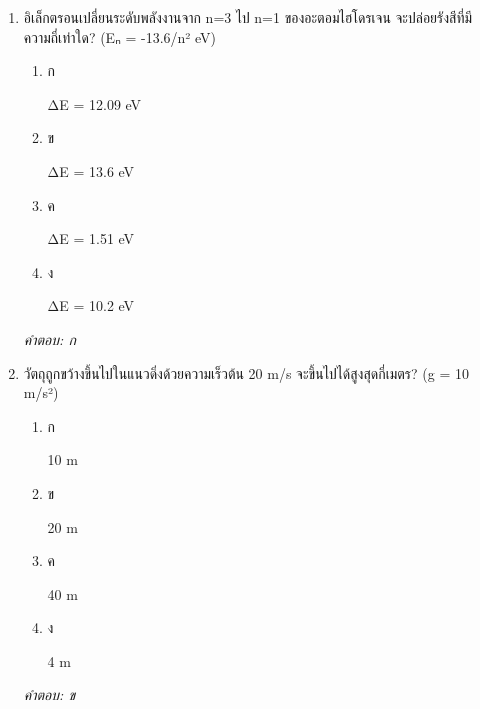 \documentclass[12pt]{article}
\begin{document}
\begin{enumerate}[label=\arabic*., itemsep=0.5\baselineskip, topsep=0.5\baselineskip, leftmargin=*]
\item อิเล็กตรอนเปลี่ยนระดับพลังงานจาก n=3 ไป n=1 ของอะตอมไฮโดรเจน จะปล่อยรังสีที่มีความถี่เท่าใด? (Eₙ = -13.6/n² eV)
\begin{enumerate}[label=\alph*)., itemsep=0.3\baselineskip, topsep=0.3\baselineskip]
\item ก\ 
\begin{minipage}[t]{0.9\linewidth}
\raggedright ΔE = 12.09 eV
\end{minipage}
\item ข\ 
\begin{minipage}[t]{0.9\linewidth}
\raggedright ΔE = 13.6 eV
\end{minipage}
\item ค\ 
\begin{minipage}[t]{0.9\linewidth}
\raggedright ΔE = 1.51 eV
\end{minipage}
\item ง\ 
\begin{minipage}[t]{0.9\linewidth}
\raggedright ΔE = 10.2 eV
\end{minipage}
\end{enumerate}
\vspace{-0.3\baselineskip}
\begin{small}
\textit{คำตอบ: ก}
\end{small}

\item วัตถุถูกขว้างขึ้นไปในแนวดิ่งด้วยความเร็วต้น 20 m/s จะขึ้นไปได้สูงสุดกี่เมตร? (g = 10 m/s²)
\begin{enumerate}[label=\alph*)., itemsep=0.3\baselineskip, topsep=0.3\baselineskip]
\item ก\ 
\begin{minipage}[t]{0.9\linewidth}
\raggedright 10 m
\end{minipage}
\item ข\ 
\begin{minipage}[t]{0.9\linewidth}
\raggedright 20 m
\end{minipage}
\item ค\ 
\begin{minipage}[t]{0.9\linewidth}
\raggedright 40 m
\end{minipage}
\item ง\ 
\begin{minipage}[t]{0.9\linewidth}
\raggedright 4 m
\end{minipage}
\end{enumerate}
\vspace{-0.3\baselineskip}
\begin{small}
\textit{คำตอบ: ข}
\end{small}


\end{enumerate}
\end{document}
